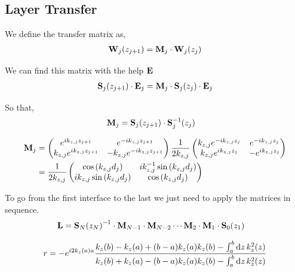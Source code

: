 \subsection{Layer Transfer} %
\label{sub:layer_transfer}

We define the transfer matrix as,
\begin{align*}
	\vb{W}_j\pqty{z_{j+1}} = \vb{M}_j \cdot \vb{W}_j\pqty{z_{j}}
\end{align*}

We can find this matrix with the help $\vb{E}$
\begin{align*}
	\vb{S}_j\pqty{z_{j+1}}\cdot \vb{E}_j = \vb{M}_j \cdot \vb{S}_j\pqty{z_{j}}\cdot \vb{E}_j
\end{align*}

So that,
\begin{align*}
	\vb{M}_j &= \vb{S}_j\pqty{z_{j+1}} \cdot \vb{S}^{-1}_j\pqty{z_{j}}
\end{align*}

\begin{align*}
	\vb{M}_j 
	&=
	\pmqty{
		e^{ik_{z,j}z_{j+1}} & 
		e^{-ik_{z,j}z_{j+1}}  \\
		k_{z,j} e^{ik_{z,j}z_{j+1}} & 
		-k_{z,j} e^{-ik_{z,j}z_{j+1}}
	} \frac{1}{2k_{z,j}}\pmqty{
		k_{z,j} e^{-ik_{z,j}z_j} & 
		e^{-ik_{z,j}z_j}  \\
		k_{z,j} e^{ik_{z,j}z_j} & 
		-e^{ik_{z,j}z_j}
		} \\
	&= \frac{1}{2k_{z,j}} 
	\pmqty{
		\cos\pqty{k_{z,j}d_j} &
		i k_{z,j}^{-1}\sin\pqty{k_{z,j}d_j} \\
		i k_{z,j} \sin\pqty{k_{z,j}d_j} &
		\cos\pqty{k_{z,j}d_j}
	}
\end{align*}

To go from the first interface to the last we just need to apply the matrices in sequence.
\begin{align*}
	\vb{L} &= \vb{S}_N\pqty{z_N}^{-1}\cdot\vb{M}_{N-1}\cdot\vb{M}_{N-2} \cdots \vb{M}_{2}\cdot\vb{M}_{1}\cdot \vb{S}_0\pqty{z_1}
\end{align*}

\begin{align*}
	r = -e^{i2k_z\pqty{a}a}\frac{
		k_z\pqty{b} - k_z\pqty{a} + \pqty{b-a} k_z\pqty{a} k_z\pqty{b}  - \int_a^b \dd{z} k_{z}^2\pqty{z}  
		}{
		k_z\pqty{b} + k_z\pqty{a} - \pqty{b-a}k_z\pqty{a} k_z\pqty{b}  - \int_a^b \dd{z} k_{z}^2\pqty{z}  
		}
\end{align*}



